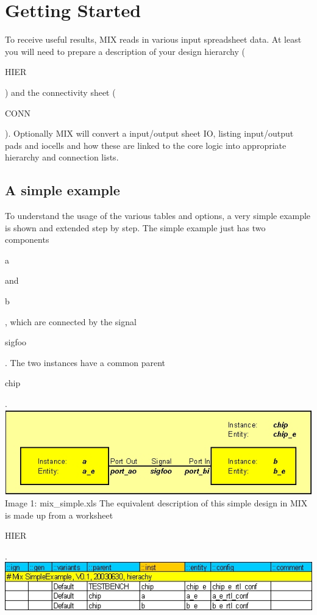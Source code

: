 \documentclass[a4paper,12pt]{article}
\begin{document}
\section{Getting Started}
To receive useful results, MIX reads in various input spreadsheet data. At least you will need to prepare a description of your design hierarchy (\begin{bf}HIER\end{bf}) and the connectivity sheet (\begin{bf}CONN\end{bf}). Optionally MIX will convert a input/output sheet IO, listing input/output pads and iocells and how these are linked to the core logic into appropriate hierarchy and connection lists.

\subsection{A simple example}
To understand the usage of the various tables and options, a very simple example is shown and extended step by step. The simple example just has two components \begin{it}a\end{it} and \begin{it}b\end{it}, which are connected by the signal \begin{it}sigfoo\end{it}. The two instances have a common parent \begin{it}chip\end{it}.\\
\includegraphics[scale=0.9]{images/mix_simple_0.jpg}\\
Image 1: mix\_simple.xls\newline
\newline
The equivalent description of this simple design in MIX is made up from a worksheet \begin{bf}HIER\end{bf}.\\
\includegraphics[scale=0.8]{images/mix_simple_1.jpg}\\
\end{document}
